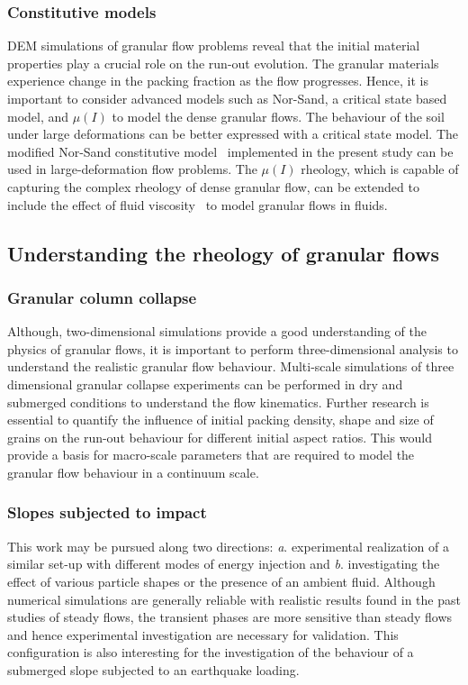 \subsubsection*{Constitutive models}

DEM simulations of granular flow problems reveal that the initial material 
properties play a crucial role on the run-out evolution. The granular materials 
experience change in the packing fraction as the flow progresses. Hence, it is 
important to consider advanced models such as Nor-Sand, a critical state based 
model, and $\mu(I)$  to model the dense granular flows. The behaviour of the 
soil under large deformations can be better expressed with a critical state 
model. The modified Nor-Sand constitutive model~\citep{Robert2010} implemented 
in the present study can be used in large-deformation flow problems. The 
$\mu(I)$ rheology, which is capable of capturing the complex rheology of dense 
granular flow, can be extended to include the effect of fluid 
viscosity~\citep{Pouliquen2005} to model granular flows in fluids. 


\subsection{Understanding the rheology of granular flows}

\subsubsection*{Granular column collapse}
Although, two-dimensional simulations provide a good understanding of the 
physics of granular flows, it is important to perform three-dimensional 
analysis to understand the realistic granular flow behaviour. Multi-scale 
simulations of three dimensional granular collapse experiments can be performed 
in dry and submerged conditions to understand the flow kinematics. Further 
research is essential to quantify the influence of initial packing density, 
shape and size of grains on the run-out behaviour for different initial aspect 
ratios. This would provide a basis for macro-scale parameters that are required 
to model the granular flow behaviour in a continuum scale.

\subsubsection*{Slopes subjected to impact}
This work may be pursued along two directions: \textit{a}. experimental 
realization of a similar set-up with different modes of energy injection and 
\textit{b}. investigating the effect of various particle shapes or the presence 
of an ambient fluid. Although numerical simulations are generally reliable with 
realistic results found in the past studies of steady flows, the transient 
phases are more sensitive than steady flows and hence experimental 
investigation are necessary for validation. This configuration is also 
interesting for the investigation of the behaviour of a submerged slope 
subjected to an earthquake loading.

